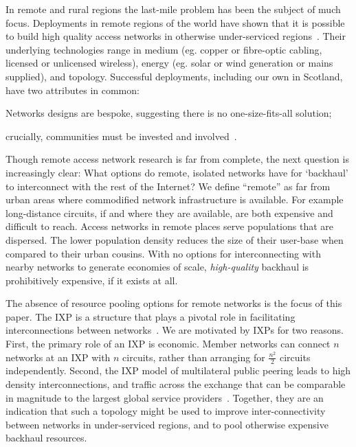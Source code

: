 In remote and rural regions the last-mile problem has been the subject of much
focus. Deployments in remote regions of the world have shown that it is possible
to build high quality access networks in otherwise under-serviced
regions~\cite{xxx}. Their underlying technologies range in medium (eg. copper
or fibre-optic cabling, licensed or unlicensed wireless), energy (eg. solar or
wind generation or mains supplied), and topology.
Successful deployments, including our own in Scotland,
have two attributes in common:
\begin{inparaenum}[(i)]
  \item Networks designs are bespoke, suggesting
    there is no one-size-fits-all solution;
  \item crucially, communities must be invested and
    involved~\cite{Wallace:2015a,Wallace:2015b}.
\end{inparaenum}

Though remote access network research is far from complete, the next question is
increasingly clear: What options do remote, isolated networks have for
`backhaul' to interconnect with the rest of the Internet? We define ``remote''
as far from urban areas where commodified network infrastructure is available.
For example long-distance circuits, if and where they are available, are both
expensive and difficult to reach. Access networks in remote places serve
populations that are dispersed. The lower population density reduces the size of
their user-base when compared to their urban cousins. With no options for
interconnecting with nearby networks to generate economies of scale,
\emph{high-quality} backhaul is prohibitively expensive, if it exists at all.


The absence of resource pooling options for remote networks is the focus of this
paper. The \acf{IXP} is a structure that plays a pivotal role in facilitating
interconnections between networks~\cite{Ager:2012}. We are motivated by
\acp{IXP} for two reasons. First, the primary role of an \ac{IXP} is economic.
Member networks can connect $n$ networks at an IXP with $n$ circuits, rather
than arranging for $\frac{n^2}{2}$ circuits independently. Second, the \ac{IXP}
model of multilateral public peering leads to high density interconnections, and
traffic across the exchange that can be comparable in magnitude to the largest
global service providers~\cite{Ager:2012}. Together, they are an indication that
such a topology might be used to improve inter-connectivity between networks in
under-serviced regions, and to pool otherwise expensive backhaul resources.

